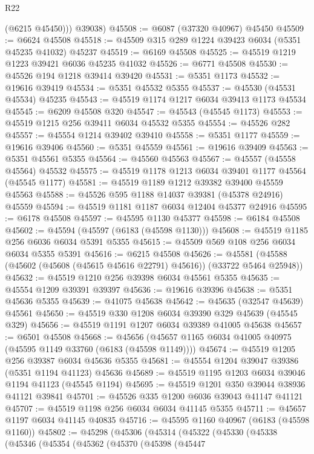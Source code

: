 \begin{lexlean}{R22}
\begin{coremodule}
          (@6215 @45450)))
      @39038)
@45508 := @6087 (@37320 @40967) @45450
@45509 := @6624 @45508
@45518 := @45509 @315 @289 @1224 @39423 @6034 (@5351 @45235 @41032) @45237
@45519 := @6169 @45508
@45525 := @45519 @1219 @1223 @39421 @6036 @45235 @41032
@45526 := @6771 @45508
@45530 := @45526 @194 @1218 @39414 @39420
@45531 := @5351 @1173
@45532 := @19616 @39419
@45534 := @5351 @45532 @5355
@45537 := @45530 (@45531 @45534) @45235
@45543 := @45519 @1174 @1217 @6034 @39413 @1173 @45534
@45545 := @6209 @45508 @320
@45547 := @45543 (@45545 @1173)
@45553 := @45519 @1215 @256 @39411 @6034 @45532 @5355
@45554 := @45526 @282
@45557 := @45554 @1214 @39402 @39410
@45558 := @5351 @1177
@45559 := @19616 @39406
@45560 := @5351 @45559
@45561 := @19616 @39409
@45563 := @5351 @45561 @5355
@45564 := @45560 @45563
@45567 := @45557 (@45558 @45564) @45532
@45575 := @45519 @1178 @1213 @6034 @39401 @1177 @45564 (@45545 @1177)
@45581 := @45519 @1189 @1212 @39382 @39400 @45559 @45563
@45588 := @45526 @595 @1188 @14037 @39381 (@45378 @24916) @45559
@45594 := @45519 @1181 @1187 @6034 @12404 @45377 @24916
@45595 := @6178 @45508
@45597 := @45595 @1130 @45377
@45598 := @6184 @45508
@45602 := @45594 (@45597 (@6183 (@45598 @1130)))
@45608 := @45519 @1185 @256 @6036 @6034 @5391 @5355
@45615 := @45509 @569 @108 @256 @6034 @6034 @5355 @5391
@45616 := @6215 @45508
@45626 := @45581 (@45588 (@45602 (@45608 (@45615 @45616 @22791) @45616)) (@33722 @5464 @25948))
@45632 := @45519 @1210 @256 @39398 @6034 @45561 @5355
@45635 := @45554 @1209 @39391 @39397
@45636 := @19616 @39396
@45638 := @5351 @45636 @5355
@45639 := @41075 @45638
@45642 := @45635 (@32547 @45639) @45561
@45650 := @45519 @330 @1208 @6034 @39390 @329 @45639 (@45545 @329)
@45656 := @45519 @1191 @1207 @6034 @39389 @41005 @45638
@45657 := @6501 @45508
@45668 := @45656 (@45657 @1165 @6034 @41005 @40975 (@45595 @1149 @33760 (@6183 (@45598 @1149))))
@45674 := @45519 @1205 @256 @39387 @6034 @45636 @5355
@45681 := @45554 @1204 @39047 @39386 (@5351 @1194 @41123) @45636
@45689 := @45519 @1195 @1203 @6034 @39046 @1194 @41123 (@45545 @1194)
@45695 := @45519 @1201 @350 @39044 @38936 @41121 @39841
@45701 := @45526 @335 @1200 @6036 @39043 @41147 @41121
@45707 := @45519 @1198 @256 @6034 @6034 @41145 @5355
@45711 := @45657 @1197 @6034 @41145 @40835
@45716 := @45595 @1160 @40967 (@6183 (@45598 @1160))
@45802 := @45298
    (@45306
      (@45314
        (@45322
          (@45330
            (@45338
              (@45346
                (@45354
                  (@45362
                    (@45370
                      (@45398
                        (@45447

\end{coremodule}
\end{lexlean}
